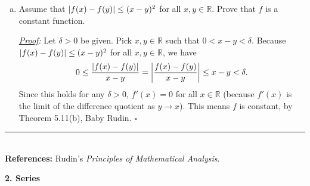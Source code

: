 \documentclass[11pt]{article}
\newcommand{\f}[2]{\frac{#1}{#2}}
\begin{document}
\begin{enumerate}[(a)]
	
	\item Assume that $\abs{f(x) - f(y)} \leq (x-y)^2$ for all $x,y\in \mathbb{R}$. Prove that $f$ is a constant function. 
	
	
	
	\noindent \textit{\underline{Proof}:} Let $\delta > 0$ be given. Pick $x,y \in \mathbb{R}$ such that $0 < x-y< \delta$. Because $\abs{f(x) - f(y)} \leq (x-y)^2$ for all $x,y\in \mathbb{R}$, we have
	\begin{align*}
	0 \leq \f{\abs{f(x) - f(y)}}{x-y} = \abs{\f{f(x) - f(y)}{x-y}} \leq x-y < \delta.
	\end{align*}
	Since this holds for any $\delta > 0$, $f'(x) = 0$ for all $x\in\mathbb{R}$ (because $f'(x)$ is the limit of the difference quotient as $y\to x$). This means $f$ is constant, by Theorem 5.11(b), Baby Rudin. \hfill $\square$
\end{enumerate}



\hrule
$\,$\\
\noindent \textbf{References:} Rudin's \textit{Principles of Mathematical Analysis}.	






















\newpage



\noindent \textbf{2. Series}
\end{document}
